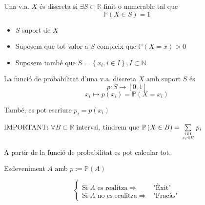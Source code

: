 \documentclass[../main.tex]{subfiles}
\begin{document}
    \begin{definicio}
        Una v.a. $X$ és discreta si $\exists S \subset \mathbb{R}$ finit o numerable tal que 
        \begin{displaymath}
            \mathbb{P}\left(X \in S\right) = 1
        \end{displaymath}
        \begin{itemize}
            \item $S$ suport de $X$
            \item Suposem que tot valor a $S$ compleix que $\mathbb{P}\left(X = x\right) > 0$
            \item Suposem també que $S = \left\{x_i, i\in I\right\}, I \subset \mathbb{N}$ 
        \end{itemize}
        \begin{definicio}
            La funció de probabilitat d'una v.a. discreta $X$ amb suport $S$ és
            \begin{displaymath}
                p: S \to \left[0, 1\right]
            \end{displaymath}
            \begin{displaymath}
                x_i \longmapsto p\left(x_i\right)  = \mathbb{P} \left(X = x_i\right)  
            \end{displaymath}
        \end{definicio}
    \end{definicio}
    \begin{notacio}
        També, es pot escriure $p_i = p\left(x_i\right)$
    \end{notacio}
    \begin{obs}
        IMPORTANT: $\forall B \subset \mathbb{R}$ interval, tindrem que $\mathbb{P}\left(X \in B\right) = \sum\limits_{i \in I\atop x_i \in B} p_i$
    \end{obs}
    \begin{obs}
        A partir de la funció de probabilitat es pot calcular tot.
    \end{obs}
    Esdeveniment $A$ amb $p := \mathbb{P}\left(A\right)$
    \begin{notacio}
        \begin{displaymath}
            \begin{cases}
                \text{Si $A$ es realitza} \Longrightarrow & \text{"Èxit"}\\
                \text{Si $A$ no es realitza} \Longrightarrow & \text{"Fracàs"}
            \end{cases}
        \end{displaymath}
    \end{notacio}
\end{document}
